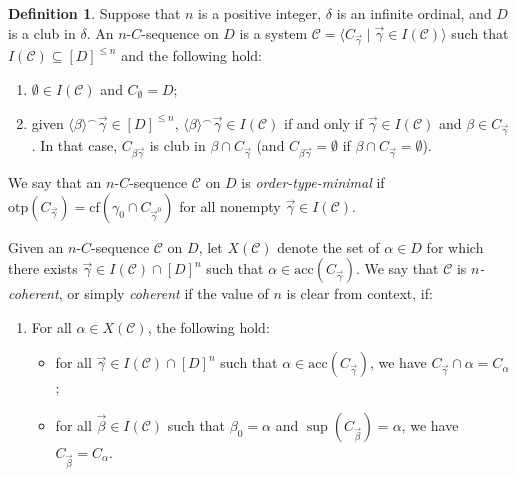 \documentclass{amsart}
\numberwithin{theorem}{section}
\theoremstyle{definition}
\newtheorem{definition}[theorem]{Definition}
\newcommand{\cf}{\mathrm{cf}}
\newcommand{\otp}{\mathrm{otp}}
\newcommand{\acc}{\mathrm{acc}}
\newcommand{\mc}{\mathcal}
\begin{document}
\begin{definition} \label{def: n_c_sequence}
  Suppose that $n$ is a positive integer, $\delta$ is an infinite ordinal, 
  and $D$ is a club in $\delta$. An $n$-$C$-sequence on $D$ is a system 
  $\mc{C} = \langle C_{\vec{\gamma}} \mid \vec{\gamma} \in I(\mc{C}) \rangle$ 
  such that $I(\mc{C}) \subseteq [D]^{\leq n}$ and the following hold:
  \begin{enumerate}
    \item $\emptyset \in I(\mc{C})$ and $C_\emptyset = D$;
    \item given $\langle \beta \rangle^\frown \vec{\gamma} \in [D]^{\leq n}$, 
    $\langle \beta \rangle^\frown \vec{\gamma} \in I(\mc{C})$ if and only if 
    $\vec{\gamma} \in I(\mc{C})$ and $\beta \in C_{\vec{\gamma}}$. In 
    that case, $C_{\beta\vec{\gamma}}$ is club in $\beta \cap C_{\vec{\gamma}}$ 
    (and $C_{\beta\vec{\gamma}} = \emptyset$ if $\beta \cap C_{\vec{\gamma}} = 
    \emptyset$).
  \end{enumerate}
  We say that an $n$-$C$-sequence $\mc{C}$ on $D$ is \emph{order-type-minimal} 
  if $\otp(C_{\vec{\gamma}}) = \cf(\gamma_0 \cap C_{\vec{\gamma}^0})$ for all 
  nonempty $\vec{\gamma} \in I(\mc{C})$.  
  
  Given an $n$-$C$-sequence $\mc{C}$ on $D$, let $X(\mc{C})$ denote the 
  set of $\alpha \in D$ for which there exists $\vec{\gamma} \in 
  I(\mc{C}) \cap [D]^n$ such that $\alpha \in \acc(C_{\vec{\gamma}})$. 
  We say that $\mc{C}$ is \emph{$n$-coherent}, or simply \emph{coherent} if 
  the value of $n$ is clear from context, if:
  \begin{enumerate}[start=3]
    \item \label{coherence_condition} For all $\alpha \in X(\mc{C})$, the following hold:
    \begin{itemize}
      \item for all $\vec{\gamma} \in I(\mc{C}) \cap [D]^n$ such that 
      $\alpha \in \acc(C_{\vec{\gamma}})$, we have 
      $C_{\vec{\gamma}} \cap \alpha = C_\alpha$;
      \item for all $\vec{\beta} \in I(\mc{C})$ such that $\beta_0 = \alpha$ 
      and $\sup(C_{\vec{\beta}}) = \alpha$, we have $C_{\vec{\beta}} = C_\alpha$.
    \end{itemize}
  \end{enumerate}    
\end{definition}
\end{document}
